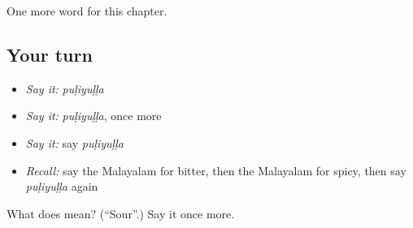 \begin{grammarlens}[title={What you've built}]
One more word for this chapter.
\end{grammarlens}

\subsection*{Your turn}
\begin{itemize}
\raggedright
  \item \emph{Say it:} \emph{puḷiyuḷḷa}
  \item \emph{Say it:} \emph{puḷiyuḷḷa}, once more
  \item \emph{Say it:} say \emph{puḷiyuḷḷa}
  \item \emph{Recall:} say the Malayalam for bitter, then the Malayalam for spicy, then say \emph{puḷiyuḷḷa} again
\end{itemize}

\begin{tcolorbox}[breakable,colback=teal!4,colframe=teal!35!black,title={Before you move on}]
What does  mean? (\textquotedblleft{}Sour\textquotedblright{}.) Say it once more.
\end{tcolorbox}
